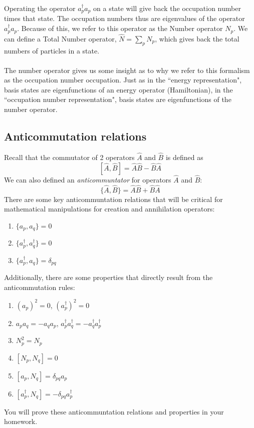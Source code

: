 \documentclass{article}
\begin{document}
Operating the operator $a_p^\dagger a_p$ on a state will give back the occupation number times that state.
The occupation numbers thus are eigenvalues of the operator $a_p^\dagger a_p$. 
Because of this, we refer to this operator as the Number operator $N_p$. 
We can define a Total Number operator, $\hat{N} = \sum_p N_p$, which gives back the total numbers of particles in a state. \\
\\
The number operator gives us some insight as to why we refer to this formalism as the occupation number occupation.
Just as in the ``energy representation", basis states are eigenfunctions of an energy operator (Hamiltonian),
in the ``occupation number representation", basis states are eigenfunctions of the number operator. 

\subsection{Anticommutation relations}

Recall that the commutator of 2 operators $\hat{A}$ and $\hat{B}$ is defined as
\[ [\hat{A}, \hat{B} ] = \hat{A}\hat{B} - \hat{B}\hat{A} \]
We can also defined an \textit{anticommuntator} for operators $\hat{A}$ and $\hat{B}$:
\[ \{\hat{A}, \hat{B} \} = \hat{A}\hat{B} + \hat{B}\hat{A} \]
There are some key anticommuntation relations that will be critical for mathematical manipulations for creation and annihilation operators:
\begin{enumerate}
\item  $\{a_p, a_q\} = 0$
\item $\{a_p^\dagger, a_q^\dagger \} = 0$
\item $\{a_p^\dagger, a_q\} = \delta_{pq}$
\end{enumerate}
Additionally, there are some properties that directly result from the anticommutation rules: 
\begin{enumerate}
\item $(a_p)^2 = 0$, $(a_p^\dagger)^2 = 0$
\item $a_pa_q = -a_qa_p$,  $a_p^\dagger a_q^\dagger = -a_q^\dagger a_p^\dagger$
\item$ N_p^2 = N_p$
\item $[N_p, N_q] = 0$
\item $[a_p, N_q] = \delta_{pq}a_p$
\item $[a_p^\dagger, N_q] = -\delta_{pq}a_p^\dagger$
\end{enumerate}
You will prove these anticommuntation relations and properties in your homework. 
\end{document}
